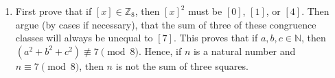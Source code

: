 \begin{enumerate}
\item First prove that if $\left[ x \right] \in \mathbb{Z}_8$, then $\left[ x \right]^2$ must be 
$\left[ 0 \right]$, $\left[ 1 \right]$, or $\left[ 4 \right]$.  Then argue (by cases if necessary), that the sum of three of these congruence classes will always be unequal to 
$\left[ 7 \right]$.  This proves that if $a, b ,c \in \mathbb{N}$, then 
$\left( a^2 + b^2 +c^2 \right) \not\equiv 7 \pmod 8$.  Hence, if $n$ is a natural number and 
$n \equiv 7 \pmod 8$, then $n$ is not the sum of three squares.






\end{enumerate}
\hbreak
\endinput

